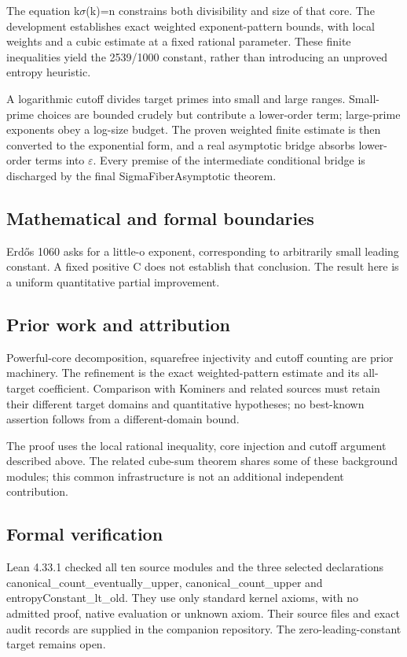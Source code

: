 \documentclass[11pt,a4paper]{article}
\begin{document}
The equation k\ensuremath{\sigma}(k)=n constrains both divisibility and size of that core. The development establishes exact weighted exponent-pattern bounds, with local weights and a cubic estimate at a fixed rational parameter. These finite inequalities yield the 2539/1000 constant, rather than introducing an unproved entropy heuristic.

A logarithmic cutoff divides target primes into small and large ranges. Small-prime choices are bounded crudely but contribute a lower-order term; large-prime exponents obey a log-size budget. The proven weighted finite estimate is then converted to the exponential form, and a real asymptotic bridge absorbs lower-order terms into \ensuremath{\varepsilon}. Every premise of the intermediate conditional bridge is discharged by the final SigmaFiberAsymptotic theorem.

\subsection{Mathematical and formal boundaries}
Erdős 1060 asks for a little-o exponent, corresponding to arbitrarily small leading constant. A fixed positive C does not establish that conclusion. The result here is a uniform quantitative partial improvement.

\subsection{Prior work and attribution}
Powerful-core decomposition, squarefree injectivity and cutoff counting are prior machinery. The refinement is the exact weighted-pattern estimate and its all-target coefficient. Comparison with Kominers and related sources must retain their different target domains and quantitative hypotheses; no best-known assertion follows from a different-domain bound.

The proof uses the local rational inequality, core injection and cutoff argument described above. The related cube-sum theorem shares some of these background modules; this common infrastructure is not an additional independent contribution.

\subsection{Formal verification}
Lean 4.33.1 checked all ten source modules and the three selected declarations canonical\_count\_eventually\_upper, canonical\_count\_upper and entropyConstant\_lt\_old. They use only standard kernel axioms, with no admitted proof, native evaluation or unknown axiom. Their source files and exact audit records are supplied in the companion repository. The zero-leading-constant target remains open.
\end{document}
